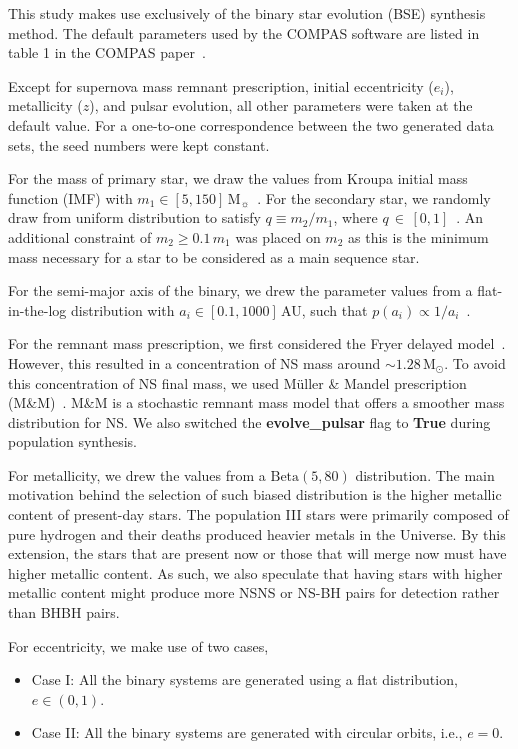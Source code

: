 \documentclass[journal, twocolumn]{IEEEtran}
\begin{document}
    This study makes use exclusively of the binary star evolution (BSE) synthesis method.
    The default parameters used by the COMPAS software are listed in table 1 in the COMPAS paper~\cite{Riley2022}.

    Except for supernova mass remnant prescription, initial eccentricity ($e_i$), metallicity ($z$), and pulsar evolution, all other parameters were taken at the default value.
    For a one-to-one correspondence between the two generated data sets, the seed numbers were kept constant.

    For the mass of primary star, we draw the values from Kroupa initial mass function (IMF) with $m_1 \in [5, 150]\,\text{M}_\sun$~\cite{kroupa2001variation}.
    For the secondary star, we randomly draw from uniform distribution to satisfy $q\equiv m_2/m_1$, where $q\,\in\,[0, 1]$~\cite{sana2012binary}.
    An additional constraint of $m_2 \geq 0.1\,m_1$ was placed on $m_2$ as this is the minimum mass necessary for a star to be considered as a main sequence star.

    For the semi-major axis of the binary, we drew the parameter values from a flat-in-the-log distribution with $a_i \in [0.1, 1000]\,$AU, such that $p(a_i) \propto 1/a_i$~\cite{opik1924photographic}.

    For the remnant mass prescription, we first considered the Fryer delayed model~\cite{Fryer2012}.
    However, this resulted in a concentration of NS mass around $\sim1.28\,\text{M}_\odot$.
    To avoid this concentration of NS final mass, we used Müller \& Mandel prescription (M\&M)~\cite{Mandel2020}.
    M\&M is a stochastic remnant mass model that offers a smoother mass distribution for NS\@.
    We also switched the \textbf{evolve\_pulsar} flag to \textbf{True} during population synthesis.

    For metallicity, we drew the values from a $\text{Beta}(5, 80)$ distribution.
    The main motivation behind the selection of such biased distribution is the higher metallic content of present-day stars.
    The population III stars were primarily composed of pure hydrogen and their deaths produced heavier metals in the Universe.
    By this extension, the stars that are present now or those that will merge now must have higher metallic content.
    As such, we also speculate that having stars with higher metallic content might produce more NSNS or NS-BH pairs for detection rather than BHBH pairs.
	

    For eccentricity, we make use of two cases,
    \begin{itemize}
        \item Case I: All the binary systems are generated using a flat distribution, $e \in (0, 1)$.
        \item Case II: All the binary systems are generated with circular orbits, i.e., $e = 0$.
    \end{itemize}
\end{document}
